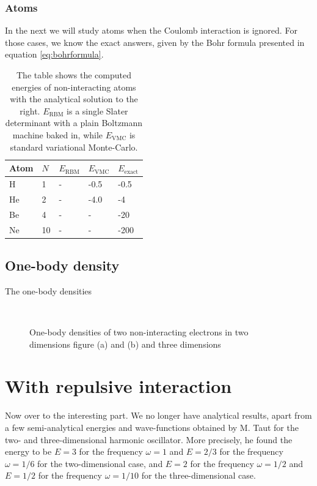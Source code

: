 \subsubsection{Atoms}
In the next we will study atoms when the Coulomb interaction is ignored. For those cases, we know the exact answers, given by the Bohr formula presented in equation \eqref{eq:bohrformula}.
\begin{table} [H]
	\caption{The table shows the computed energies of non-interacting atoms with the analytical solution to the right. $E_{\text{RBM}}$ is a single Slater determinant with a plain Boltzmann machine baked in, while $E_{\text{VMC}}$ is standard variational Monte-Carlo.}
	\begin{tabularx}{\textwidth}{X|X|X:X:X} \hline\hline
		\label{tab:nointeractionatoms}
		Atom & $N$ & $E_{\text{RBM}}$ & $E_{\text{VMC}}$ & $E_{\text{exact}}$ \\ \hline
		H & 1 & - & -0.5 & -0.5 \\ 
		He & 2 & - & -4.0 & -4 \\
		Be & 4 & - & - & -20 \\
		Ne & 10 & - & - & -200 \\ \hline\hline
	\end{tabularx}
\end{table}


\subsection{One-body density}
The one-body densities 

\begin{figure} [h]%
	\centering
	\\
	
	\caption{One-body densities of two non-interacting electrons in two dimensions figure (a) and (b) and three dimensions}%
	\label{fig:OB_nointeraction}
\end{figure}

\section{With repulsive interaction}
Now over to the interesting part. We no longer have analytical results, apart from a few semi-analytical energies and wave-functions obtained by M. Taut for the two- and three-dimensional harmonic oscillator. More precisely, he found the energy to be $E=3$ for the frequency $\omega=1$ and $E=2/3$ for the frequency $\omega=1/6$ for the two-dimensional case, and $E=2$ for the frequency $\omega=1/2$ and $E=1/2$ for the frequency $\omega=1/10$ for the three-dimensional case. \cite{taut_two_1993}\cite{taut_two_1994}

